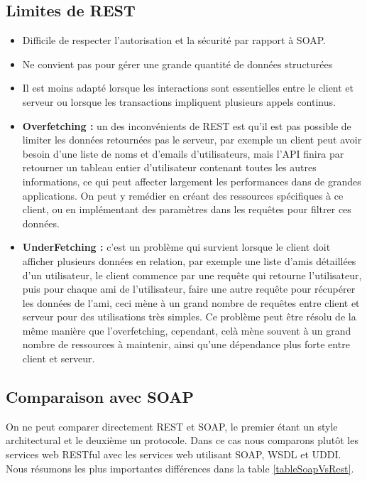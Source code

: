 \subsection{Limites de REST}
\begin{itemize}
	\item Difficile de respecter l'autorisation et la sécurité par rapport à SOAP.
	\item Ne convient pas pour gérer une grande quantité de données structurées
	\item Il est moins adapté lorsque les interactions sont essentielles entre le client et serveur ou lorsque les transactions impliquent plusieurs appels continus.
	\item \textbf{Overfetching :} un des inconvénients de REST est qu'il est pas possible de limiter les données retournées pas le serveur, par exemple un client peut avoir besoin d'une liste de noms et d'emails d'utilisateurs, mais l'API finira par retourner un tableau entier d'utilisateur contenant toutes les autres informations, ce qui peut affecter largement les performances dans de grandes applications. On peut y remédier en créant des ressources spécifiques à ce client, ou en implémentant des paramètres dans les requêtes pour filtrer ces données.
	\item \textbf{UnderFetching :} c'est un problème qui survient lorsque le client doit afficher plusieurs données en relation, par exemple une liste d'amis détaillées d'un utilisateur, le client commence par une requête qui retourne l'utilisateur, puis pour chaque ami de l'utilisateur, faire une autre requête pour récupérer les données de l'ami, ceci mène à un grand nombre de requêtes entre client et serveur pour des utilisations très simples.
	Ce problème peut être résolu de la même manière que l'overfetching, cependant, celà mène souvent à un grand nombre de ressources à maintenir, ainsi qu'une dépendance plus forte entre client et serveur.
\end{itemize}

\subsection{Comparaison avec SOAP}
On ne peut comparer directement REST et SOAP, le premier étant un style architectural et le deuxième un protocole. Dans ce cas nous comparons plutôt les services web RESTful avec les services web utilisant SOAP, WSDL et UDDI.
Nous résumons les plus importantes différences dans la table \ref{tableSoapVsRest}.

